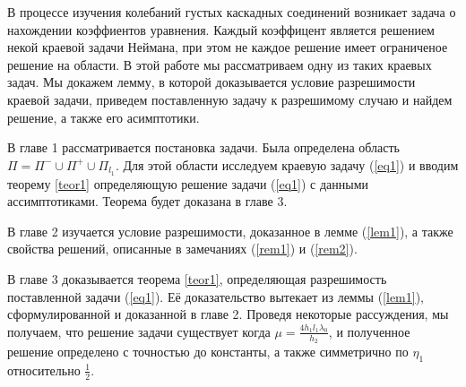 \documentclass[12pt,titlepage]{report}
\begin{document}
В процессе изучения колебаний густых каскадных соединений возникает задача о нахождении коэффиентов уравнения. Каждый коэффицент является решением некой краевой задачи Неймана, при этом не каждое решение имеет ограниченое решение на области. В этой работе мы рассматриваем одну из таких краевых задач. Мы докажем лемму, в которой доказывается условие разрешимости краевой задачи, приведем поставленную задачу к разрешимому случаю и найдем решение, а также его асимптотики.  

В главе 1 рассматривается постановка задачи.  Была определена область\\ $\Pi=\Pi^{-} \cup \Pi^{+} \cup \Pi_{l_{1}}$. Для этой области исследуем краевую задачу (\ref{eq1}) и вводим теорему \ref{teor1} определяющую решение задачи (\ref{eq1}) с данными ассимптотиками. Теорема будет доказана в главе 3.

В главе 2 изучается условие разрешимости, доказанное в лемме (\ref{lem1}), а также свойства решений, описанные в замечаниях (\ref{rem1}) и (\ref{rem2}).

В главе 3 доказывается теорема \ref{teor1}, определяющая разрешимость поставленной задачи (\ref{eq1}).  Её доказательство вытекает из леммы (\ref{lem1}), сформулированной и доказанной в главе 2. Проведя некоторые рассуждения, мы получаем, что решение задачи существует когда $\mu=\frac{4 h_{1} l_{1} \lambda_{0}}{h_{2}}$, и полученное решение определено с точностью до константы, а также симметрично по $\eta_{1}$ относительно $\frac{1}{2}$.
\\
\newpage
\end{document}

